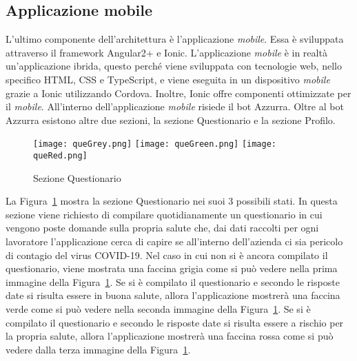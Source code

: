 \begin{trivlist}
	\item\subsection{Applicazione mobile}
	L'ultimo componente dell'\gls{architettura}\ap{[g]} è l'applicazione \emph{mobile}. Essa è sviluppata attraverso il \gls{framework}\ap{[g]} Angular2+ e Ionic. L'applicazione \emph{mobile} è in realtà un'\gls{applicazione ibrida}\ap{[g]}, questo perché viene sviluppata con tecnologie web, nello specifico \gls{HTML}, \gls{CSS} e TypeScript, e viene eseguita in un dispositivo \emph{mobile} grazie a Ionic utilizzando Cordova. Inoltre, Ionic offre componenti ottimizzate per il \emph{mobile}. All'interno dell'applicazione \emph{mobile} risiede il \gls{bot}\ap{[g]} Azzurra. Oltre al \gls{bot}\ap{[g]} Azzurra esistono altre due sezioni, la sezione Questionario e la sezione Profilo. 
	
	\begin{figure}[h]
		\centering
		\texttt{[image: queGrey.png]}\hfill
		\texttt{[image: queGreen.png]}\hfill
		\texttt{[image: queRed.png]}
		\caption{Sezione Questionario}\label{fig:que}
	\end{figure}
	
	La Figura~\ref{fig:que} mostra la sezione Questionario nei suoi 3 possibili stati. In questa sezione viene richiesto di compilare quotidianamente un questionario in cui vengono poste domande sulla propria salute che, dai dati raccolti per ogni lavoratore l'applicazione cerca di capire se all'interno dell'azienda ci sia pericolo di contagio del virus COVID-19. Nel caso in cui non si è ancora compilato il questionario, viene mostrata una faccina grigia come si può vedere nella prima immagine della Figura~\ref{fig:que}. Se si è compilato il questionario e secondo le risposte date si risulta essere in buona salute, allora l'applicazione mostrerà una faccina verde come si può vedere nella seconda immagine della Figura~\ref{fig:que}. Se si è compilato il questionario e secondo le risposte date si risulta essere a rischio per la propria salute, allora l'applicazione mostrerà una faccina rossa come si può vedere dalla terza immagine della Figura~\ref{fig:que}.
	

\end{trivlist}
